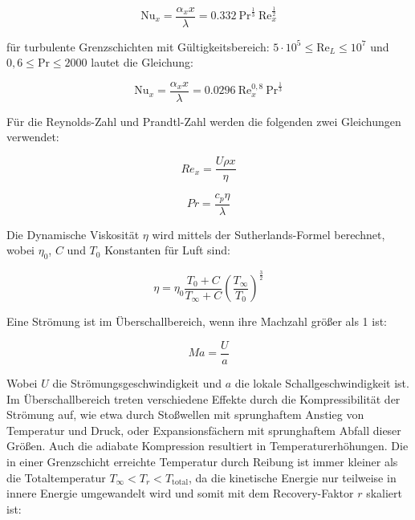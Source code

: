 \begin{equation}
  \label{eq:nusselt_laminar}
  \text{Nu}_x = \frac{\alpha_x x}{\lambda} = \num{0,332} \ \text{Pr}^{\frac{1}{3}} \ \text{Re}_x^{\frac{1}{2}}
\end{equation}

für turbulente Grenzschichten mit Gültigkeitsbereich: $5 \cdot 10^5 \leq \text{Re}_L \leq 10^7$ und $ 0,6 \leq \text{Pr} \leq 2000$ lautet die Gleichung:

\begin{equation}
  \label{eq:nusselt_turbulent}
  \text{Nu}_x = \frac{\alpha_x x}{\lambda} = \num{0,0296} \ \text{Re}_x^{0,8} \ \text{Pr}^{\frac{1}{3}}
\end{equation}

Für die Reynolds-Zahl und Prandtl-Zahl werden die folgenden zwei Gleichungen verwendet:

\noindent\begin{minipage}{.5\linewidth}
  \begin{equation}
    \label{eq:reynolds}
    Re_x = \frac{U \rho x}{\eta}
  \end{equation}
\end{minipage}%
\begin{minipage}{.5\linewidth}
  \begin{equation}
    \label{eq:prandtl}
    Pr = \frac{c_p \eta}{\lambda}
  \end{equation}
\end{minipage}

Die Dynamische Viskosität $\eta$ wird mittels der Sutherlands-Formel berechnet, wobei $\eta_0$, $C$ und $T_0$ Konstanten für Luft sind:

\begin{equation}
  \label{eq:dynamische_viskositaet}
  \eta = \eta_0 \frac{T_0 + C}{T_{\infty} + C} {\left( \frac{T_{\infty}}{T_0} \right)}^{\frac{3}{2}}
\end{equation}

Eine Strömung ist im Überschallbereich, wenn ihre Machzahl größer als 1 ist:

\begin{equation}
  \label{eq:machzahl}
  Ma = \frac{U}{a}
\end{equation}

Wobei $U$ die Strömungsgeschwindigkeit und $a$ die lokale Schallgeschwindigkeit ist. Im Überschallbereich treten verschiedene
Effekte durch die Kompressibilität der Strömung auf, wie etwa durch Stoßwellen mit sprunghaftem Anstieg von Temperatur und Druck,
oder Expansionsfächern mit sprunghaftem Abfall dieser Größen. Auch die adiabate Kompression resultiert in Temperaturerhöhungen.
Die in einer Grenzschicht erreichte Temperatur durch Reibung
ist immer kleiner als die Totaltemperatur $T_{\infty} < T_r < T_\mathrm{total}$, da die kinetische Energie nur teilweise in innere Energie
umgewandelt wird und somit mit dem Recovery-Faktor $r$ skaliert ist:

